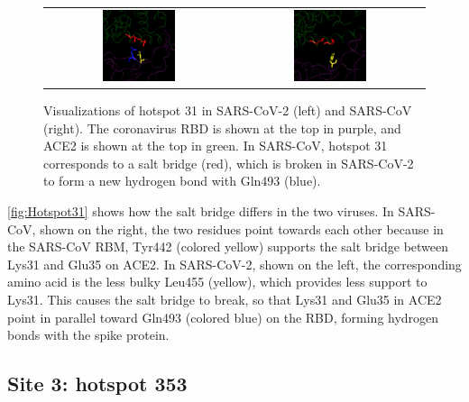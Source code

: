 \begin{figure}[h]
	\centering
	\mySfFamily
	\begin{tabular}{c c}
	\includegraphics[width = 0.4\textwidth]{../images/Hotspot31_SARS-2.png} & \includegraphics[width = 0.4\textwidth]{../images/Hotspot31_SARS.png}
	\end{tabular}
	\caption{Visualizations of hotspot 31 in SARS-CoV-2 (left) and SARS-CoV (right). The coronavirus RBD is shown at the top in purple, and ACE2 is shown at the top in green. In SARS-CoV, hotspot 31 corresponds to a salt bridge (red), which is broken in SARS-CoV-2 to form a new hydrogen bond with Gln493 (blue).}
	\label{fig:Hotspot31}
\end{figure}

\autoref{fig:Hotspot31} shows how the salt bridge differs in the two viruses. In SARS-CoV, shown on the right, the two residues point towards each other because in the SARS-CoV RBM, Tyr442 (colored yellow) supports the salt bridge between Lys31 and Glu35 on ACE2. In SARS-CoV-2, shown on the left, the corresponding amino acid is the less bulky Leu455 (yellow), which provides less support to Lys31. This causes the salt bridge to break, so that Lys31 and Glu35 in ACE2 point in parallel toward Gln493 (colored blue) on the RBD, forming hydrogen bonds with the spike protein.

\FloatBarrier
{}
\subsection{Site 3: hotspot 353}

